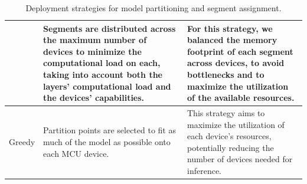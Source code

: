 \begin{table}[H]
\begin{tabularx}{0.95\textwidth}{|m{3.22cm}|X|X|}
      & 
      Segments are distributed across the maximum number of devices to minimize the 
      computational load on each, taking into account both the layers' computational 
      load and the devices' capabilities. 
      &
      For this strategy, we balanced the memory footprint of each segment across devices, 
      to avoid bottlenecks and to maximize the utilization of the available resources.
      \\
    \hline
    Greedy
      & 
      Partition points are selected to fit as much of the model as possible onto each
      \ac{MCU} device.
      &
      This strategy aims to maximize the utilization of each device's resources,
      potentially reducing the number of devices needed for inference.
      \\
    \hline
  \end{tabularx}
  \vspace{2mm}
  \caption{Deployment strategies for model partitioning and segment assignment.}
  \label{tab:deployment-strategies}
\end{table}
